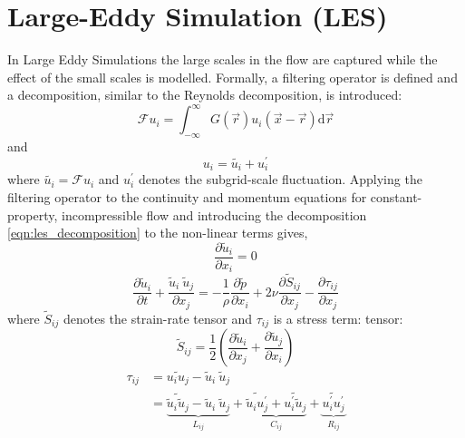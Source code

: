 \section{Large-Eddy Simulation (LES)}\label{sec:LES}
In Large Eddy Simulations the large scales in the ﬂow are captured while the effect of the small scales
is modelled. Formally, a filtering operator is defined and a decomposition, similar to the Reynolds
decomposition, is introduced:
\begin{equation}
\mathcal{F}u_i = \int_{-\infty}^\infty G\left( \overrightarrow{r} \right) u_i\left( \overrightarrow{x} - \overrightarrow{r} \right) \text{d} \overrightarrow{r}
\label{eqn:les_filtering}
\end{equation}
and
\begin{equation}
u_i = \tilde{u_i} + u_i^\prime
\label{eqn:les_decomposition}
\end{equation}
where $\tilde{u_i} = \mathcal{F}u_i$ and $u_i^\prime$ denotes the subgrid-scale fluctuation. Applying
the filtering operator to the continuity and momentum equations for constant-property, incompressible
flow and introducing the decomposition \eqref{eqn:les_decomposition} to the non-linear terms gives,
\begin{equation}
\frac{\partial \tilde{u}_i}{\partial x_i} = 0
\label{eqn:filtered_continuity}
\end{equation}
\begin{equation}
\frac{\partial \tilde{u}_i}{\partial t} + \frac{\tilde{u}_i \ \tilde{u}_j}{\partial x_j} =
 -\frac 1 \rho \frac{\partial \tilde p}{\partial x_i}
 + 2 \nu \frac{\partial \tilde S_{ij}}{\partial x_j} - \frac{\partial \tau_{ij}}{\partial x_j}
\label{eqn:filtered_momentum}
\end{equation}
where $\tilde S_{ij}$ denotes the strain-rate tensor and $\tau_{ij}$ is a stress term:
tensor:
\begin{equation}
\tilde S_{ij} = \frac 1 2 \left ( \frac{\partial \tilde u_i}{\partial x_j} + \frac{\partial \tilde u_j}{\partial x_i} \right )
\label{eqn:defin_strain_rate_tensor}
\end{equation}
\begin{align}
\tau_{ij} &= \widetilde{u_i u_j} - \tilde u_i \ \tilde u_j \nonumber \\
          &= \underbrace{\widetilde{ \tilde u_i \tilde u_j} - \tilde u_i \ \tilde u_j}_{L_{ij}} + \underbrace{\widetilde{\tilde{u}_i u_j^\prime} + \widetilde{u_i^\prime \tilde{u}_j}}_{C_{ij}} + \underbrace{\widetilde{u_i^\prime u_j^\prime}}_{R_{ij}}
\label{eqn:defin_sgs_stress_tensor}
\end{align}
